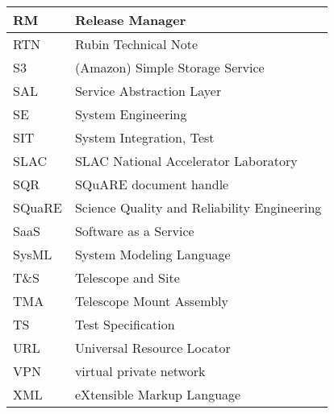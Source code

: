 \begin{longtable}{p{}p{}}
RM & Release Manager \\\hline
RTN & Rubin Technical Note \\\hline
S3 & (Amazon) Simple Storage Service  \\\hline
SAL & Service Abstraction Layer \\\hline
SE & System Engineering \\\hline
SIT & System Integration, Test \\\hline
SLAC & SLAC National Accelerator Laboratory \\\hline
SQR & SQuARE document handle \\\hline
SQuaRE & Science Quality and Reliability Engineering \\\hline
SaaS & Software as a Service \\\hline
SysML & System Modeling Language \\\hline
T\&S & Telescope and Site \\\hline
TMA & Telescope Mount Assembly \\\hline
TS & Test Specification \\\hline
URL & Universal Resource Locator \\\hline
VPN & virtual private network \\\hline
XML & eXtensible Markup Language \\\hline
\end{longtable}
